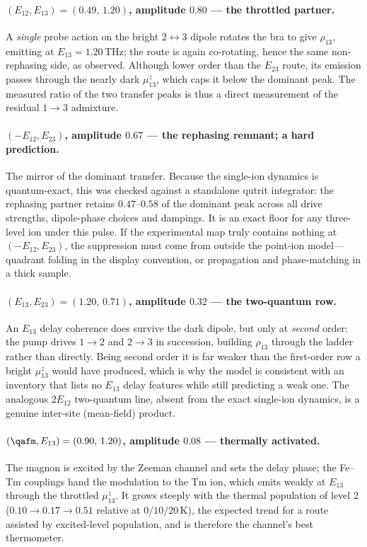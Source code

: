 \paragraph{$(E_{12},E_{13})=(0.49,\,1.20)$, amplitude $0.80$ --- the
throttled partner.}
A \emph{single} probe action on the bright $2\!\leftrightarrow\!3$
dipole rotates the bra to give $\rho_{13}$, emitting at
$E_{13}=1.20$\,THz; the route is again co-rotating, hence the same
non-rephasing side, as observed.  Although lower order than the
$E_{23}$ route, its emission passes through the nearly dark
$\mu^z_{13}$, which caps it below the dominant peak.  The measured
ratio of the two transfer peaks is thus a direct measurement of the
residual $1\!\to\!3$ admixture.

\paragraph{$(-E_{12},E_{23})$, amplitude $0.67$ --- the rephasing
remnant; a hard prediction.}
The mirror of the dominant transfer.  Because the single-ion dynamics
is quantum-exact, this was checked against a standalone qutrit
integrator: the rephasing partner retains $0.47$--$0.58$ of the
dominant peak across all drive strengths, dipole-phase choices and
dampings.  It is an exact floor for any three-level ion under this
pulse.  If the experimental map truly contains nothing at
$(-E_{12},E_{23})$, the suppression must come from outside the
point-ion model---quadrant folding in the display convention, or
propagation and phase-matching in a thick sample.

\paragraph{$(E_{13},E_{23})=(1.20,\,0.71)$, amplitude $0.32$ --- the
two-quantum row.}
An $E_{13}$ delay coherence does survive the dark dipole, but only at
\emph{second} order: the pump drives $1\!\to\!2$ and $2\!\to\!3$ in
succession, building $\rho_{13}$ through the ladder rather than
directly.  Being second order it is far weaker than the first-order
row a bright $\mu^z_{13}$ would have produced, which is why the model
is consistent with an inventory that lists no $E_{13}$ delay features
while still predicting a weak one.  The analogous $2E_{12}$
two-quantum line, absent from the exact single-ion dynamics, is a
genuine inter-site (mean-field) product.

\paragraph{$(\qafm,E_{13})=(0.90,\,1.20)$, amplitude $0.08$ ---
thermally activated.}
The magnon is excited by the Zeeman channel and sets the delay phase;
the Fe--Tm couplings hand the modulation to the Tm ion, which emits
weakly at $E_{13}$ through the throttled $\mu^z_{13}$.  It grows
steeply with the thermal population of level 2
($0.10\to0.17\to0.51$ relative at $0/10/20$\,K), the expected trend for
a route assisted by excited-level population, and is therefore the
channel's best thermometer.


